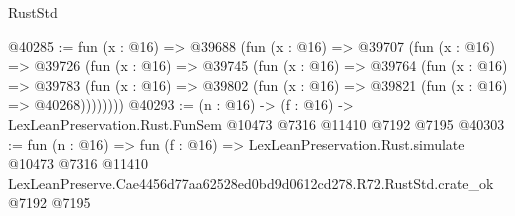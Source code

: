 \begin{lexlean}{RustStd}
\begin{coremodule}
@40285 := fun (x : @16) =>
  @39688
    (fun (x : @16) =>
    @39707
      (fun (x : @16) =>
      @39726
        (fun (x : @16) =>
        @39745
          (fun (x : @16) =>
          @39764
            (fun (x : @16) =>
            @39783
              (fun (x : @16) => @39802 (fun (x : @16) => @39821 (fun (x : @16) => @40268))))))))
@40293 := (n : @16) -> (f : @16) -> LexLeanPreservation.Rust.FunSem @10473 @7316 @11410 @7192 @7195
@40303 := fun (n : @16) =>
  fun (f : @16) =>
  LexLeanPreservation.Rust.simulate
    @10473
    @7316
    @11410
    LexLeanPreserve.Cae4456d77aa62528ed0bd9d0612cd278.R72.RustStd.crate_ok
    @7192
    @7195
\end{coremodule}
\end{lexlean}
